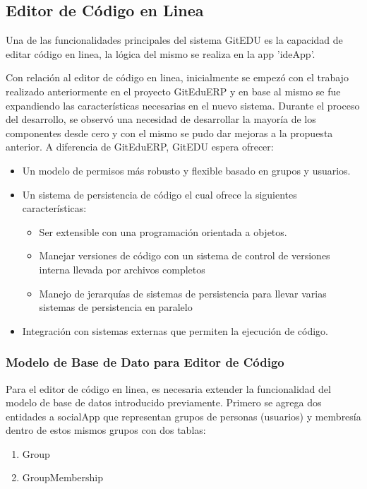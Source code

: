 \subsection{Editor de Código en Linea}
Una de las funcionalidades principales del sistema GitEDU es la capacidad de editar código en linea, la lógica del mismo se realiza en la app 'ideApp'.

Con relación al editor de código en linea, inicialmente se empezó con el trabajo realizado anteriormente en el proyecto GitEduERP y en base al mismo se fue expandiendo las características necesarias en el nuevo sistema. Durante el proceso del desarrollo, se observó una necesidad de desarrollar la mayoría de los componentes desde cero y con el mismo se pudo dar mejoras a la propuesta anterior. A diferencia de GitEduERP, GitEDU espera ofrecer:
\begin{itemize}
  \item Un modelo de permisos más robusto y flexible basado en grupos y usuarios.
  \item Un sistema de persistencia de código el cual ofrece la siguientes características:
    \begin{itemize}
      \item Ser extensible con una programación orientada a objetos.
      \item Manejar versiones de código con un sistema de control de versiones interna llevada por archivos completos
      \item Manejo de jerarquías de sistemas de persistencia para llevar varias sistemas de persistencia en paralelo
    \end{itemize}
   \item Integración con sistemas externas que permiten la ejecución de código.
\end{itemize}

\subsubsection{Modelo de Base de Dato para Editor de Código}
Para el editor de código en linea, es necesaria extender la funcionalidad del modelo de base de datos introducido previamente. Primero se agrega dos entidades a socialApp que representan grupos de personas (usuarios) y membresía dentro de estos mismos grupos con dos tablas:
\begin{enumerate}
\item Group
\item GroupMembership
\end{enumerate}

